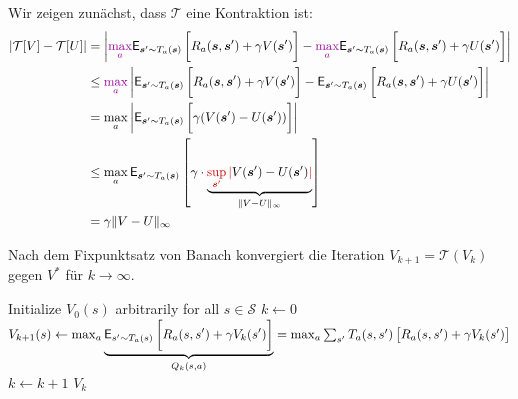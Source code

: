 \begin{beweis}
  Wir zeigen zunächst, dass $\mathcal{T}$ eine Kontraktion ist:
  \begin{align*}
      \left| \mathcal{T}[V] - \mathcal{T}[U] \right|
      &=
      \left|
          \lila{\max_{a}}
          \mathsf{E}_{\bm{s}' \sim T_a(\bm{s})}
          \left[
              \vphantom{\int}
              R_a(\bm{s}, \bm{s}') + \gamma 
              V(\bm{s}')
          \right]
          -
          \lila{\max_{a}}
          \mathsf{E}_{\bm{s}' \sim T_a(\bm{s})}
          \left[
              \vphantom{\int}
              R_a(\bm{s}, \bm{s}') + \gamma 
              U(\bm{s}')
          \right]
      \right| \\
      &\leq
      \lila{\max_{a}}
      \left|
          \mathsf{E}_{\bm{s}' \sim T_a(\bm{s})}
          \left[
              \vphantom{\int}
              R_a(\bm{s}, \bm{s}') + \gamma 
              V(\bm{s}')
          \right]
          -
          \mathsf{E}_{\bm{s}' \sim T_a(\bm{s})}
          \left[
              \vphantom{\int}
              R_a(\bm{s}, \bm{s}') + \gamma 
              U(\bm{s}')
          \right]
      \right|
      \\
      &=
      \max_{a}
      \left|
          \mathsf{E}_{\bm{s}' \sim T_a(\bm{s})}
          \left[
              \vphantom{\int}
              \gamma
              (V(\bm{s}') - U(\bm{s}'))
          \right]
      \right|
      \\
      &\leq
      \max_{a}
      \mathsf{E}_{\bm{s}' \sim T_a(\bm{s})}
      \left[
          \vphantom{\int}
          \gamma
          \cdot
          \underbrace{
              \rot{\sup_{\bm{s}'} |} V(\bm{s}') - U(\bm{s}') \rot{|}
          }_{
              \|V - U\|_{\infty}
          }
      \right]
      \\
      &=
      \gamma \|V - U\|_{\infty}
  \end{align*}

  Nach dem Fixpunktsatz von Banach \cite{sutton_barto_2018}
  konvergiert die Iteration $V_{k+1} = \mathcal{T}(V_k)$ gegen $V^*$ für $k \to \infty$.
\end{beweis}

\begin{algorithm}
    \caption{Value Iteration}
    \begin{algorithmic}
        \State Initialize $V_0(s)$ arbitrarily for all $s \in \mathcal{S}$
        \State $k \gets 0$
        \Repeat
        \State $V_{k+1}(s) \gets \max_{a} 
        \underbrace{
            \mathsf{E}_{s' \sim T_a(s)} 
            \left[ 
                \vphantom{\int}
                R_a(s, s') + \gamma V_k(s') 
            \right]}_{Q_{k}(s,a)}
            =
            \max_a \sum_{s'} T_a(s,s') 
            \left[ 
                \vphantom{\int}
                R_a(s,s') + \gamma V_k(s') 
            \right]
        $
        \EndFor
        \State $k \gets k + 1$
        \State \Return $V_k$
    \end{algorithmic}
\end{algorithm}

